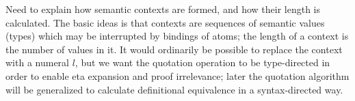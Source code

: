 \documentclass{article}
\newcommand\FmtKwd[1]{\mathsf{#1}}
\newcommand\FmtTm[1]{{\color{Violet}#1}}
\newcommand\FmtVal[1]{{\color{Red}{#1}}}
\begin{document}
\newcommand\QuoteCan[4]{
  \FmtVal{#1}\vDash\FmtVal{#2}\ni\FmtVal{#3}\Uparrow\FmtTm{#4}
}

\newcommand\QuoteNeu[4]{
  \FmtVal{#1}\vDash\FmtVal{#2}\Uparrow\FmtTm{#3}\in\FmtVal{#4}
}

\newcommand\SortCtx[1]{\FmtKwd{ctx}_{#1}}

Need to explain how semantic contexts are formed, and how their length
is calculated. The basic ideas is that contexts are sequences of
semantic values (types) which may be interrupted by bindings of atoms;
the length of a context is the number of values in it. It would
ordinarily be possible to replace the context with a numeral $l$, but
we want the quotation operation to be type-directed in order to enable
eta expansion and proof irrelevance; later the quotation algorithm
will be generalized to calculate definitional equivalence in a
syntax-directed way.
\end{document}
